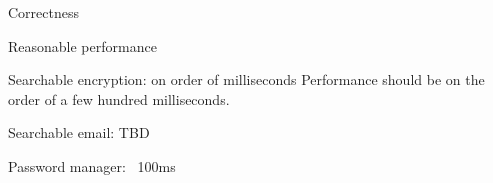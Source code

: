 \documentclass[onecolumn, draftclsnofoot,10pt, compsoc]{IEEEtran}
\begin{document}
    Correctness

    Reasonable performance

        Searchable encryption: on order of milliseconds
        Performance should be on the order of a few hundred milliseconds.

        Searchable email: TBD

        Password manager: ~100ms


{}
\end{document}
